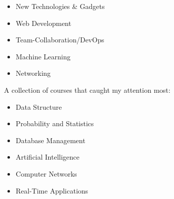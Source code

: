 






\begin{itemize}
\item{New Technologies \& Gadgets}
\item  Web Development
\item Team-Collaboration/DevOps
\item Machine Learning
\item Networking
\end{itemize}

A collection of courses that caught my attention most:
\begin{itemize}
\item Data Structure
\item Probability and Statistics
\item Database Management
\item Artificial Intelligence
\item Computer Networks
\item Real-Time Applications
\end{itemize}


\divider








